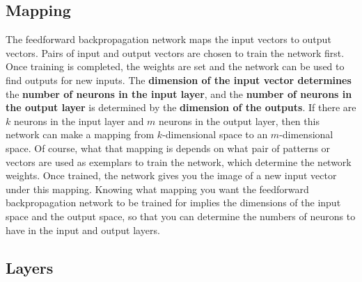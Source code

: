 \documentclass[12pt, right open]{memoir}
\begin{document}
\subsection{Mapping}
The feedforward backpropagation network maps the input vectors to output
vectors. Pairs of input and output vectors are chosen to train the network first.
Once training is completed, the weights are set and the network can be used to
find outputs for new inputs. The \textbf{dimension of the input vector determines} the
\textbf{number of neurons in the input layer}, and the \textbf{number of neurons in the output
layer} is determined by the \textbf{dimension of the outputs}. If there are $k$ neurons in
the input layer and $m$ neurons in the output layer, then this network can make a
mapping from $k$-dimensional space to an $m$-dimensional space. Of course,
what that mapping is depends on what pair of patterns or vectors are used as 
exemplars to train the network, which determine the network weights. Once
trained, the network gives you the image of a new input vector under this
mapping. Knowing what mapping you want the feedforward backpropagation
network to be trained for implies the dimensions of the input space and the
output space, so that you can determine the numbers of neurons to have in the
input and output layers.

\subsection{Layers}
\end{document}
